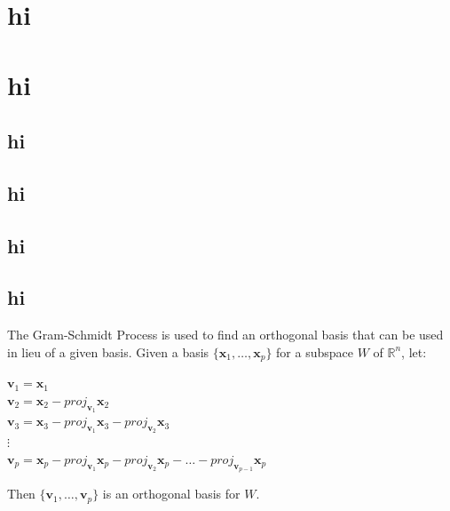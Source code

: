 \documentclass{report}
\begin{document}
\chapter{hi}
\chapter{hi}
\section{hi}
\section{hi}
\section{hi}
\section{hi}

\clearpage

The Gram-Schmidt Process is used to find an orthogonal basis that can be used in lieu of a given basis. Given a basis $\{ \mathbf{x}_1, \ldots, \mathbf{x}_p \}$ for a subspace $W$ of $\mathbb{R}^n$, let:

\begin{center}
	$
	\mathbf{v}_1 = \mathbf{x}_1$ \\
	$\mathbf{v}_2 = \mathbf{x}_2 - proj_{\mathbf{v}_1}\mathbf{x}_2$ \\
	$\mathbf{v}_3 = \mathbf{x}_3 - proj_{\mathbf{v}_1}\mathbf{x}_3 - proj_{\mathbf{v}_2}\mathbf{x}_3$ \\
	$\vdots$ \\
	$\mathbf{v}_p = \mathbf{x}_p - proj_{\mathbf{v}_1}\mathbf{x}_p - proj_{\mathbf{v}_2}\mathbf{x}_p - \ldots - proj_{\mathbf{v}_{p-1}}\mathbf{x}_p
	$
\end{center}

Then $\{ \mathbf{v}_1, \ldots, \mathbf{v}_p \}$ is an orthogonal basis for $W$.
\end{document}
